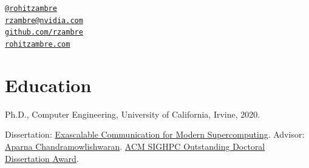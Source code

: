 \documentclass[11pt,article,oneside]{memoir}
\makeatletter
\def\myemail{rzambre@nvidia.com}
\def\myweb{rohitzambre.com}
\def\mygithub{github.com/rzambre}
\def\mytwitter{@rohitzambre}
\makeatother
\begin{document}
\begin{minipage}[t]{2.95in}
  
\end{minipage}
\hfill     
\hfill
\begin{minipage}[t]{1.3in}
  \flushright \footnotesize 
  {\scriptsize  \texttt{\href{http://twitter.com/rohitzambre}{\mytwitter}} \, \faTwitter }  \\ 
  {\scriptsize  \texttt{\href{mailto:\myemail}{\myemail}} \, \faEnvelope} \\
  {\scriptsize  \texttt{\href{https://github.com/rzambre}{\mygithub}} \, \faGithub} \\
  {\scriptsize  \texttt{\href{https://www.rohitzambre.com}{\myweb}} \, \faGlobe}
\end{minipage}

\medskip

\reversemarginpar

\bigskip       

\section{Education}



\ind Ph.D., Computer Engineering, University of California, Irvine, 2020.

\ind \hspace{0.35in} \footnotesize Dissertation: \href{https://escholarship.org/uc/item/2g34n1hs}{Exascalable Communication for Modern Supercomputing}.
\newline Advisor: \href{https://hpcforge.eng.uci.edu/}{Aparna Chandramowlishwaran}.
\newline \href{https://www.sighpc.org/for-your-career/dissertation-award/2021-award-winner-rohit-zambre}{ACM SIGHPC Outstanding Doctoral Dissertation Award}.
\normalsize \vspace{0.05in}
\end{document}
